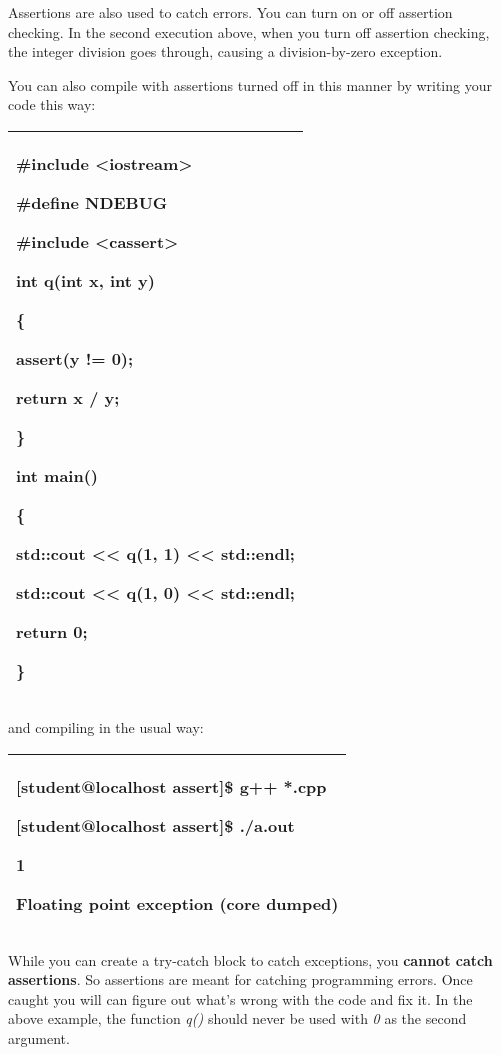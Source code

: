 \documentclass[
]{article}
\begin{document}
Assertions are also used to catch errors. You can turn on or off
assertion checking. In the second execution above, when you turn off
assertion checking, the integer division goes through, causing a
division-by-zero exception.

You can also compile with assertions turned off in this manner by
writing your code this way:

\begin{longtable}[]{@{}l@{}}
\toprule
\endhead
\begin{minipage}[t]{0.97\columnwidth}\raggedright
\#include \textless iostream\textgreater{}

\#define NDEBUG

\#include \textless cassert\textgreater{}

int q(int x, int y)

\{

assert(y != 0);

return x / y;

\}

int main()

\{

std::cout \textless\textless{} q(1, 1) \textless\textless{} std::endl;

std::cout \textless\textless{} q(1, 0) \textless\textless{} std::endl;

return 0;

\}\strut
\end{minipage}\tabularnewline
\bottomrule
\end{longtable}

and compiling in the usual way:

\begin{longtable}[]{@{}l@{}}
\toprule
\endhead
\begin{minipage}[t]{0.97\columnwidth}\raggedright
{[}student@localhost assert{]}\$ g++ *.cpp

{[}student@localhost assert{]}\$ ./a.out

1

Floating point exception (core dumped)\strut
\end{minipage}\tabularnewline
\bottomrule
\end{longtable}

While you can create a try-catch block to catch exceptions, you
\textbf{cannot catch assertions}. So assertions are meant for catching
programming errors. Once caught you will can figure out what's wrong
with the code and fix it. In the above example, the function \emph{q()}
should never be used with \emph{0} as the second argument.
\end{document}
